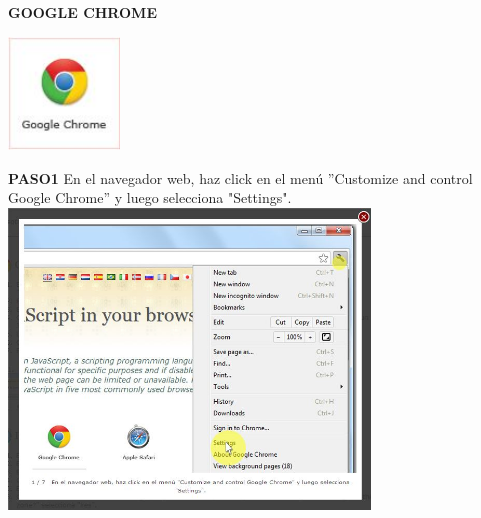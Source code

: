 \documentclass[11pt]{article} %
\begin{document}
\newpage

\textbf {GOOGLE CHROME} \\
\begin{center}
\includegraphics[height=3cm, width=3 cm] {imagenes/chrome.JPG}
\end{center}

\textbf{PASO1}
 En el navegador web, haz click en el menú ''Customize and control Google Chrome'' 
y luego selecciona "Settings". \\

\includegraphics[height=8cm, width=8 cm] {imagenes/chrome 01.JPG}
\newline
\end{document}
